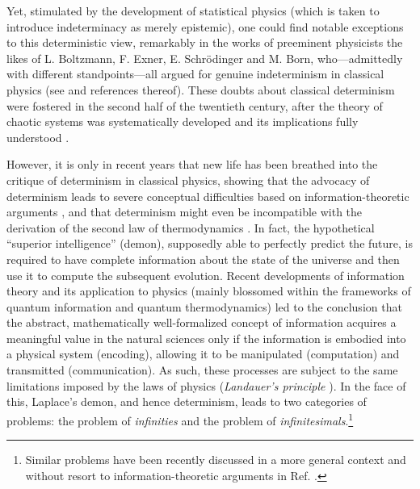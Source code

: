\documentclass[12pt]{article}
\begin{document}
Yet, stimulated by the development of statistical physics (which is taken to introduce indeterminacy as merely epistemic), one could find notable exceptions to this deterministic view, remarkably in the works of preeminent physicists the likes of L. Boltzmann, F. Exner, E. Schr{\"o}dinger and M. Born, who---admittedly with different standpoints---all argued for genuine indeterminism in classical physics (see \cite{delsanto} and references thereof). These doubts about classical determinism were fostered in the second half of the twentieth century, after the theory of chaotic systems was systematically developed and its implications fully understood \cite{ornstein, prigogine}.

However, it is only in recent years that new life has been breathed into the critique of determinism in classical physics, showing that the advocacy of determinism leads to severe conceptual difficulties based on information-theoretic arguments \cite{dowek, gisin1, blundell}, and that determinism might even be incompatible with the derivation of the second law of thermodynamics \cite{drossel}. In fact, the hypothetical ``superior intelligence'' (demon), supposedly able to perfectly predict the future, is required to have complete information about the state of the universe and then use it to compute the subsequent evolution. Recent developments of information theory and its application to physics (mainly blossomed within the frameworks of quantum information and quantum thermodynamics) led to the conclusion that the abstract, mathematically well-formalized concept of information acquires a meaningful value in the natural sciences only if the information is embodied into a physical system (encoding), allowing it to be manipulated (computation) and transmitted (communication). As such, these processes are subject to the same limitations imposed by the laws of physics (\emph{Landauer's principle} \cite{landauer}). In the face of this, Laplace's demon, and hence determinism, leads to two categories of problems: the problem of \emph{infinities} and the problem of \emph{infinitesimals}.\footnote{Similar problems have  been recently discussed in a more general context and without resort to information-theoretic arguments in Ref. \cite{ellisinf}.}
\end{document}
